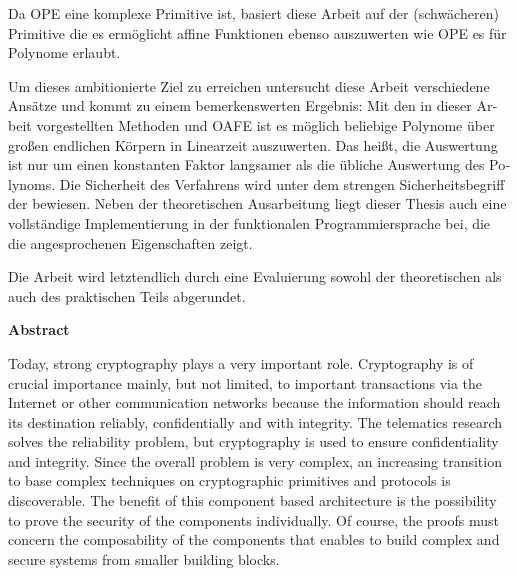 \begin{otherlanguage}{ngerman}
Da OPE eine komplexe Primitive ist, basiert diese Arbeit auf der
(schwächeren) Primitive  die
es ermöglicht affine Funktionen ebenso auszuwerten wie OPE es für Polynome
erlaubt.

Um dieses ambitionierte Ziel zu erreichen untersucht diese Arbeit verschiedene
Ansätze und kommt zu einem bemerkenswerten Ergebnis: Mit den in dieser Arbeit
vorgestellten Methoden und OAFE ist es möglich beliebige Polynome über großen
endlichen Körpern in Linearzeit auszuwerten. Das heißt, die Auswertung ist nur
um einen konstanten Faktor langsamer als die übliche Auswertung des Polynoms.
Die Sicherheit des Verfahrens wird unter dem strengen Sicherheitsbegriff der
 \cite{canetti05} bewiesen. Neben der
theoretischen Ausarbeitung liegt dieser Thesis auch eine vollständige
Implementierung in der funktionalen Programmiersprache \JWThaskell{} bei, die
die angesprochenen Eigenschaften zeigt.

Die Arbeit wird letztendlich durch eine Evaluierung sowohl der theoretischen als
auch des praktischen Teils abgerundet.

\end{otherlanguage}


\cleardoublepage

\noindent{}\textsf{\textbf{\huge Abstract}}

\bigskip{}

\noindent{}Today, strong cryptography plays a very important role. Cryptography
is of crucial importance mainly, but not limited, to important transactions via
the Internet or other communication networks because the information should
reach its destination reliably, confidentially and with integrity. The
telematics research solves the reliability problem, but cryptography is used to
ensure confidentiality and integrity. Since the overall problem is very complex,
an increasing transition to base complex techniques on cryptographic primitives
and protocols is discoverable. The benefit of this component based architecture
is the possibility to prove the security of the components individually. Of
course, the proofs must concern the composability of the components that enables
to build complex and secure systems from smaller building blocks.


